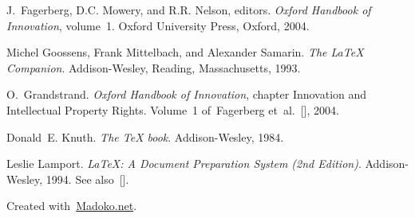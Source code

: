\documentclass[10pt]{book}
\begin{document}
{%
\begin{thebibliography}{5}%
\label{sec-bibliography}%

J.~Fagerberg, D.C. Mowery, and R.R. Nelson, editors.
\newblock  \emph{Oxford Handbook of Innovation}, volume~1.
\newblock  Oxford University Press, Oxford, 2004.\label{fberg04}%

Michel Goossens, Frank Mittelbach, and Alexander Samarin.
\newblock  \emph{The LaTeX Companion}.
\newblock  Addison-Wesley, Reading, Massachusetts, 1993.\label{goo93}%

O.~Grandstrand.
\newblock  \emph{Oxford Handbook of Innovation}, chapter Innovation and
  Intellectual Property Rights.
\newblock  Volume~1 of~Fagerberg et~al.~[], 2004.\label{grandstrand}%

Donald~E. Knuth.
\newblock  \emph{The TeX book}.
\newblock  Addison-Wesley, 1984.\label{knuth:tex}%

Leslie Lamport.
\newblock  \emph{LaTeX: A Document Preparation System (2nd Edition)}.
\newblock  Addison-Wesley, 1994.
\newblock  See also~[].\label{lamport:latex}%
\par%
\end{thebibliography}}%

\begin{mdbmargintb}{4em}{}%
\begin{mdflushright}%
{\tiny Created with~\href{https://www.madoko.net}{Madoko.net}.}%
\end{mdflushright}%
\end{mdbmargintb}%
\end{document}

